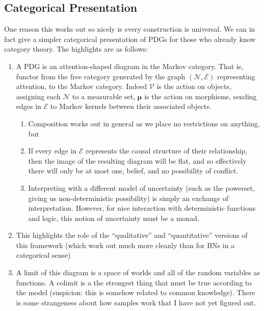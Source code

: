 \documentclass{article}
\newcommand{\bmu}{\boldsymbol{\mu}}
\newcommand{\Ed}{\mathcal E}
\numberwithin{equation}{section}
\begin{document}
	
	\begin{vcat}
		\section{Categorical Presentation}
		One reason this works out so nicely is every construction is universal. We can in fact give a simpler categorical presentation of PDGs for those who already know category theory. The highlights are as follows:
		\begin{enumerate}
			\item A PDG is an attention-shaped diagram in the Markov category. That is, functor from the free category generated by the graph $(\mathcal N, \Ed)$ representing attention, to the Markov category. Indeed $\mathcal V$ is the action on objects, assigning each $\mathcal N$ to a measurable set, $\bmu$ is the action on morphisms, sending edges in $\Ed$ to Markov kernels between their associated objects. 
			\begin{enumerate}
				\item Composition works out in general as we place no restrictions on anything, but
				\item If every edge in $\Ed$ represents the causal structure of their relationship, then the image of the resulting diagram will be flat, and so effectively there will only be at most one, belief, and no possibility of conflict.
				\item Interpreting with a different model of uncertainty (such as the powerset, giving us non-deterministic possibility) is simply an exchange of interpretation. However, for nice interaction with deterministic functions and logic, this notion of uncertainty must be a monad.
			\end{enumerate}
			
			\item This highlights the role of the ``qualitative'' and ``quantitative'' versions of this framework (which work out much more cleanly than for BNs in a categorical sense)
			
			\item A limit of this diagram is a space of worlds and all of the random variables as functions. A colimit is a the strongest thing that must be true according to the model (suspicion: this is somehow related to common knowledge). There is some strangeness about how samples work that I have not yet figured out.
		\end{enumerate}
		

\end{vcat}
\end{document}
